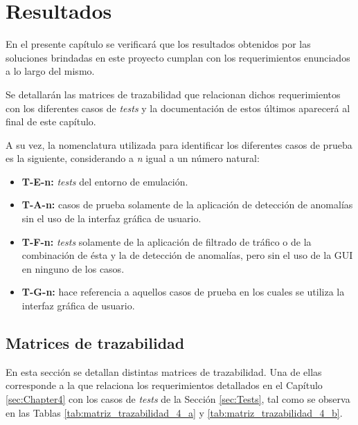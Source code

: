 \chapter{Resultados} %

\label{sec:Resultados} %

En el presente capítulo se verificará que los resultados obtenidos por las soluciones brindadas en este proyecto cumplan con los requerimientos enunciados a lo largo del mismo.

Se detallarán las matrices de trazabilidad que relacionan dichos requerimientos con los diferentes casos de \textit{tests} y la documentación de estos últimos aparecerá al final de este capítulo.

A su vez, la nomenclatura utilizada para identificar los diferentes casos de prueba es la siguiente, considerando a \textit{n} igual a un número natural:

\begin{itemize}
\item{\textbf{T-E-n:} \textit{tests} del entorno de emulación.}
\item{\textbf{T-A-n:} casos de prueba solamente de la aplicación de detección de anomalías sin el uso de la interfaz gráfica de usuario.}
\item{\textbf{T-F-n:} \textit{tests} solamente de la aplicación de filtrado de
    tráfico o de la combinación de ésta y la de detección de
    anomalías, pero sin el uso de la GUI en ninguno de los casos.}
\item{\textbf{T-G-n:} hace referencia a aquellos casos de prueba en los cuales se utiliza la interfaz gráfica de usuario.}
\end{itemize}

\section {Matrices de trazabilidad}

En esta sección se detallan distintas matrices de trazabilidad. Una de ellas
corresponde a la que relaciona los requerimientos detallados en el Capítulo
\ref{sec:Chapter4} con los casos de \textit{tests} de la Sección
\ref{sec:Tests}, tal como se observa en las Tablas
\ref{tab:matriz_trazabilidad_4_a} y \ref{tab:matriz_trazabilidad_4_b}.

